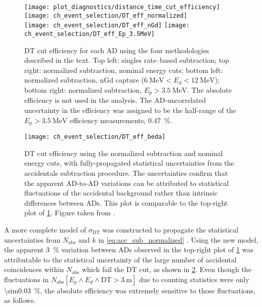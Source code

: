 \begin{figure}
    \centering
    \texttt{[image: plot\_diagnostics/distance\_time\_cut\_efficiency]}
    \texttt{[image: ch\_event\_selection/DT\_eff\_normalized]} \\
    \texttt{[image: ch\_event\_selection/DT\_eff\_nGd]}
    \texttt{[image: ch\_event\_selection/DT\_eff\_Ep\_3.5MeV]}
    \caption[DT cut efficiency study]{
        DT cut efficiency for each AD using the four methodologies
        described in the text.
        Top left: singles rate--based subtraction;
        top right: normalized subtraction, nominal energy cuts;
        bottom left: normalized subtraction, nGd capture
        ($\SI{6}{\MeV} < E_d < \SI{12}{\MeV}$);
        bottom right: normalized subtraction, $E_p > \SI{3.5}{\MeV}$.
        The absolute efficiency is not used in the \thetaot{} analysis.
        The AD-uncorrelated uncertainty in the efficiency
        was assigned to be the half-range of the $E_p > \SI{3.5}{\MeV}$
        efficiency measurements, \SI{0.47}{\percent}.
    }
    \label{fig:DT_eff}
\end{figure}

\begin{figure}
    \centering
    \texttt{[image: ch\_event\_selection/DT\_eff\_beda]}
    \caption[DT efficiency with full statistical uncertainty]{
        DT cut efficiency using the normalized subtraction
        and nominal energy cuts,
        with fully-propagated statistical uncertainties
        from the accidentals subtraction procedure.
        The uncertainties confirm that the apparent AD-to-AD variations
        can be attributed to statistical fluctuations of the accidental background
        rather than intrinsic differences between ADs.
        This plot is comparable to the top-right plot of \cref{fig:DT_eff}.
        Figure taken from \cite{beda_DT_eff_unc}.
    }
    \label{fig:DT_eff_beda}
\end{figure}


A more complete model of $\sigma_\text{DT}$ was constructed
to propagate the statistical uncertainties
from $N_\text{obs}$ and $k$ in \cref{eq:acc_sub_normalized}
\cite{beda_DT_eff_unc}.
Using the new model, the apparent \SI{3}{\percent} variation between ADs
observed in the top-right plot of \cref{fig:DT_eff}
was attributable to the statistical uncertainty
of the large number of accidental coincidences within $N_\text{obs}$
which fail the DT cut,
as shown in \cref{fig:DT_eff_beda}.
Even though the fluctuations in
$N_\text{obs}[E_p \wedge E_d \wedge \text{DT} > \SI{3}{\m}]$
due to counting statistics were only \SI{\sim0.03}{\percent},
the absolute efficiency was extremely sensitive to those fluctuations, as follows.

